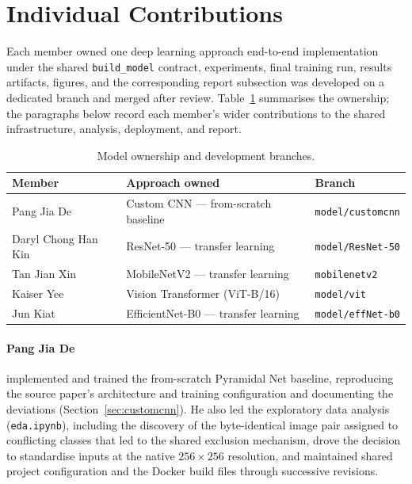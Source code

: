 \documentclass[11pt,twoside,a4paper]{article}
\begin{document}
\section{Individual Contributions}
\label{sec:contributions}

Each member owned one deep learning approach end-to-end implementation under the shared \texttt{build\_model} contract, experiments, final training
run, results artifacts, figures, and the corresponding report subsection was
developed on a dedicated branch and merged after review. Table~\ref{tab:members}
summarises the ownership; the paragraphs below record each member's wider
contributions to the shared infrastructure, analysis, deployment, and report.

\begin{table}[H]
\centering
\caption{Model ownership and development branches.}
\label{tab:members}
\renewcommand{\arraystretch}{1.35}
\begin{tabular}{@{}lll@{}}
\toprule
\textbf{Member} & \textbf{Approach owned} & \textbf{Branch} \\
\midrule
Pang Jia De         & Custom CNN --- from-scratch baseline & \texttt{model/customcnn} \\
Daryl Chong Han Kin & ResNet-50 --- transfer learning & \texttt{model/ResNet-50} \\
Tan Jian Xin        & MobileNetV2 --- transfer learning & \texttt{mobilenetv2} \\
Kaiser Yee          & Vision Transformer (ViT-B/16) & \texttt{model/vit} \\
Jun Kiat            & EfficientNet-B0 --- transfer learning & \texttt{model/effNet-b0} \\
\bottomrule
\end{tabular}
\renewcommand{\arraystretch}{1}
\end{table}


\paragraph{Pang Jia De} implemented and trained the from-scratch Pyramidal
Net baseline, reproducing the source paper's architecture and training
configuration and documenting the deviations (Section~\ref{sec:customcnn}).
He also led the exploratory data analysis (\texttt{eda.ipynb}), including
the discovery of the byte-identical image pair assigned to conflicting
classes that led to the shared exclusion mechanism, drove the decision to
standardise inputs at the native $256 \times 256$ resolution, and maintained
shared project configuration and the Docker build files through successive
revisions.
\end{document}
